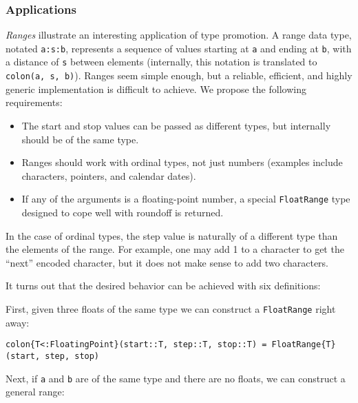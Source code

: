 


\subsubsection{Applications}

\emph{Ranges} illustrate an interesting application of type promotion.
A range data type, notated \texttt{a:s:b}, represents a sequence of values
starting at \texttt{a} and ending at \texttt{b}, with a distance of \texttt{s}
between elements (internally, this notation is translated to
\texttt{colon(a, s, b)}). Ranges seem simple enough, but a reliable,
efficient, and highly generic implementation is difficult to achieve.
We propose the following requirements:

\begin{itemize}
\item The start and stop values can be passed as different types, but internally
  should be of the same type.
\item Ranges should work with ordinal types, not just numbers (examples include
  characters, pointers, and calendar dates).
\item If any of the arguments is a floating-point number, a special
  \texttt{FloatRange} type designed to cope well with roundoff is returned.
\end{itemize}

In the case of ordinal types, the step value is naturally of a different type
than the elements of the range. For example, one may add 1 to a character to
get the ``next'' encoded character, but it does not make sense to add two
characters.

It turns out that the desired behavior can be achieved with six definitions:

First, given three floats of the same type we can construct a \texttt{FloatRange}
right away:

\begin{verbatim}
colon{T<:FloatingPoint}(start::T, step::T, stop::T) = FloatRange{T}(start, step, stop)
\end{verbatim}

Next, if \texttt{a} and \texttt{b} are of the same type and there are no floats,
we can construct a general range:

